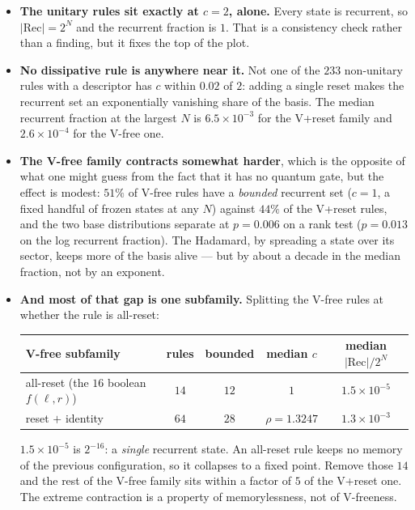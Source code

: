 \documentclass[11pt]{article}
\theoremstyle{plain}
\theoremstyle{definition}
\begin{document}
\begin{itemize}
\item \textbf{The unitary rules sit exactly at $c=2$, alone.} Every state is
  recurrent, so $|\mathrm{Rec}|=2^N$ and the recurrent fraction is $1$. That is a
  consistency check rather than a finding, but it fixes the top of the plot.
\item \textbf{No dissipative rule is anywhere near it.} Not one of the $233$
  non-unitary rules with a descriptor has $c$ within $0.02$ of $2$: adding a
  single reset makes the recurrent set an exponentially vanishing share of the
  basis. The median recurrent fraction at the largest $N$ is
  $6.5\times10^{-3}$ for the V+reset family and $2.6\times10^{-4}$ for the V-free
  one.
\item \textbf{The V-free family contracts somewhat harder}, which is the opposite
  of what one might guess from the fact that it has no quantum gate, but the
  effect is modest: $51\%$ of V-free rules have a \emph{bounded} recurrent set
  ($c=1$, a fixed handful of frozen states at any $N$) against $44\%$ of the
  V+reset rules, and the two base distributions separate at $p=0.006$ on a rank
  test ($p=0.013$ on the log recurrent fraction). The Hadamard, by spreading a
  state over its sector, keeps more of the basis alive --- but by about a decade
  in the median fraction, not by an exponent.
\item \textbf{And most of that gap is one subfamily.} Splitting the V-free rules
  at whether the rule is all-reset:
  \begin{center}\small
  \begin{tabular}{lcccc}
  \toprule
  V-free subfamily & rules & bounded & median $c$ & median $|\mathrm{Rec}|/2^N$ \\
  \midrule
  all-reset (the $16$ boolean $f(\ell,r)$) & $14$ & $12$ & $1$ & $1.5\times10^{-5}$ \\
  reset $+$ identity & $64$ & $28$ & $\rho=1.3247$ & $1.3\times10^{-3}$ \\
  \bottomrule
  \end{tabular}
  \end{center}
  $1.5\times10^{-5}$ is $2^{-16}$: a \emph{single} recurrent state. An all-reset
  rule keeps no memory of the previous configuration, so it collapses to a fixed
  point. Remove those $14$ and the rest of the V-free family sits within a factor
  of $5$ of the V+reset one. The extreme contraction is a property of
  memorylessness, not of V-freeness.
\end{itemize}
\end{document}
